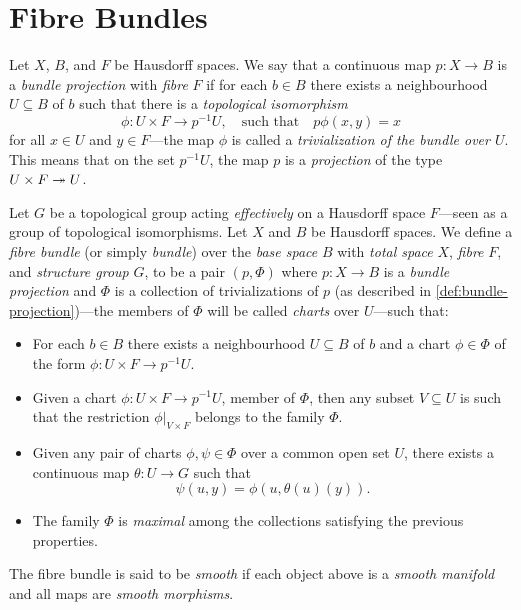 \documentclass[../../../deep-dive]{subfile}
\begin{document}
\section{Fibre Bundles}

\begin{definition}
\label{def:bundle-projection}
Let \(X\), \(B\), and \(F\) be Hausdorff spaces. We say that a continuous map
\(p: X \to B\) is a \emph{bundle projection} with \emph{fibre} \(F\) if for each
\(b \in B\) there exists a neighbourhood \(U \subseteq B\) of \(b\) such that
there is a \emph{topological isomorphism}
\[
\phi: U \times F \longrightarrow p^{-1} U,
\quad\text{such that}\quad
p \phi(x, y) = x
\]
for all \(x \in U\) and \(y \in F\)---the map \(\phi\) is called a
\emph{trivialization of the bundle over \(U\)}. This means that on the set
\(p^{-1} U\), the map \(p\) is a \emph{projection} of the type
\(U \times F \twoheadrightarrow U\).
\end{definition}

\begin{definition}
\label{def:fibre-bundle}
Let \(G\) be a topological group acting \emph{effectively} on a Hausdorff space
\(F\)---seen as a group of topological isomorphisms. Let \(X\) and \(B\) be
Hausdorff spaces. We define a \emph{fibre bundle} (or simply \emph{bundle}) over
the \emph{base space} \(B\) with \emph{total space} \(X\), \emph{fibre} \(F\),
and \emph{structure group} \(G\), to be a pair \((p, \Phi)\) where
\(p: X \to B\) is a \emph{bundle projection} and \(\Phi\) is a collection of
trivializations of \(p\) (as described in \cref{def:bundle-projection})---the
members of \(\Phi\) will be called \emph{charts} over \(U\)---such that:
\begin{itemize}\setlength\itemsep{0em}
\item For each \(b \in B\) there exists a neighbourhood \(U \subseteq B\) of
  \(b\) and a chart \(\phi \in \Phi\) of the form
  \(\phi: U \times F \to p^{-1} U\).

\item Given a chart \(\phi: U \times F \to p^{-1} U\), member of \(\Phi\), then
  any subset \(V \subseteq U\) is such that the restriction
  \(\phi|_{V \times F}\) belongs to the family \(\Phi\).

\item Given any pair of charts \(\phi, \psi \in \Phi\) over a common open set
  \(U\), there exists a continuous map \(\theta: U \to G\) such that
  \[
  \psi(u, y) = \phi(u, \theta(u)(y)).
  \]

\item The family \(\Phi\) is \emph{maximal} among the collections satisfying the
  previous properties.
\end{itemize}
The fibre bundle is said to be \emph{smooth} if each object above is a
\emph{smooth manifold} and all maps are \emph{smooth morphisms}.
\end{definition}
\end{document}
